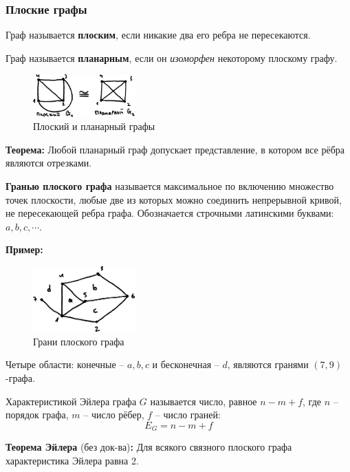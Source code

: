 \documentclass[12pt, a4paper]{article}
\begin{document}
\subsubsection{Плоские графы}

Граф называется \textbf{плоским}, если никакие два его ребра не пересекаются.

Граф называется \textbf{планарным}, если он \textit{изоморфен} некоторому плоскому графу.

\begin{figure}[h]
 \centering
 \includegraphics[width=0.35\textwidth]{51}
 \vspace{-3mm}
 \caption{Плоский и планарный графы}
\end{figure}

\textbf{Теорема:} Любой планарный граф допускает представление, в котором все рёбра являются отрезками.

\textbf{Гранью плоского графа} называется максимальное по включению множество точек плоскости, любые две из которых можно соединить непрерывной кривой, не пересекающей ребра графа. Обозначается строчными латинскими буквами: $a, b, c, \cdots$.

\textbf{Пример:}

\begin{figure}[h]
 \centering
 \includegraphics[width=0.35\textwidth]{52}
 \vspace{-4mm}
 \caption{Грани плоского графа}
\end{figure}

Четыре области: конечные -- $a,b,c$ и бесконечная -- $d$, являются гранями $(7,9)$-графа.

Характеристикой Эйлера графа $G$ называется число, равное $n-m+f$, где $n$ -- порядок графа, $m$ -- число рёбер, $f$ -- число граней:
\[E_G = n - m + f \]

\textbf{Теорема Эйлера} (без док-ва)\textbf{:} Для всякого связного плоского графа характеристика Эйлера равна 2.
\end{document}
